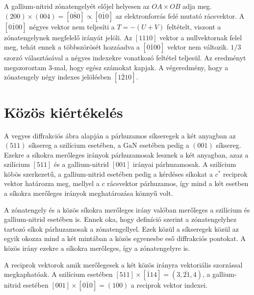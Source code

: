 \documentclass[pdftex,12pt,a4paper]{article}
\begin{document}
		A gallium-nitrid zónatengelyét előjel helyesen az $OA\times OB$ adja meg. $(200)\times (004)=[0\bar{8}0]\propto[0\bar{1}0]$ az elektronforrás felé mutató rácsvektor. A $[0\bar{1}00]$ négyes vektor nem teljesíti a $T=-(U+V)$ feltételt, viszont a zónatengelynek megfelelő irányát jelöli. Az $[1110]$ vektor a nullvektornak felel meg, tehát ennek a többszörösét hozzáadva a $[0\bar{1}00]$ vektor nem változik. $1/3$ szorzó választásával a négyes indexekre vonatkozó feltétel teljesül. Az eredményt megszoroztam 3-mal, hogy egész számokat kapjak. A végeredmény, hogy a zónatengely négy indexes jelölésben $[1\bar{2}10]$.
	\section{Közös kiértékelés}
		A vegyes diffrakciós ábra alapján a párhuzamos síkseregek a két anyagban az $(511)$ síksereg a szilícium esetében, a $\text{GaN}$ esetében pedig a $(001)$ síksereg. Ezekre a síkokra merőleges irányok párhuzamosak lesznek a két anyagban, azaz a szilícium $[511]$ és a gallium-nitrid $[001]$ irányai párhuzamosak. A szilícium köbös szerkezetű, a gallium-nitrid esetében pedig a kérdéses síkokat a $c^*$ reciprok vektor határozza meg, mellyel a $c$ rácsvektor párhuzamos, így mind a két esetben a síkokra merőleges irányok meghatározása könnyű volt.
		
		A zónatengely és a közös síkokra merőleges irány valóban merőleges a szilícium és gallium-nitrid esetében is. Ennek oka, hogy definíció szerint a zónatengelyhez tartozó síkok párhuzamosak a zónatengellyel. Ezek közül a síkseregek közül az egyik okozza mind a két mintában a közös egyenesbe eső diffrakciós pontokat. A közös irány ezekre a síkokra merőleges, így a zónatengelyre is.
		
		A reciprok vektorok amik merőlegesek a két közös irányra vektoriális szorzással megkaphatóak. A szilícium esetében $[511]\times[\bar{1}14]=(3,\bar{21},4)$, a gallium-nitrid esetében $[001]\times[0\bar{1}0]=(100)$ a reciprok vektor indexei.
	
\end{document}
